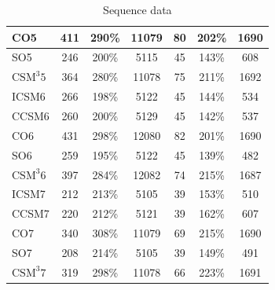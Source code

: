 \documentclass[12pt]{article}
\begin{document}
\begin{table}
\begin{tabular}{| l | c | c | c | c | c | c |}
    CO5 & 411 & 290\% & 11079 & 80 & 202\% & 1690 \\\hline
    SO5 & 246 & 200\% & 5115 & 45 & 143\% & 608 \\\hline
    $\text{CSM}^{3}5$ & 364 & 280\% & 11078 & 75 & 211\% & 1692 \\\hline\hline
%
    ICSM6 & 266 & 198\% & 5122 & 45 & 144\% & 534 \\\hline
    CCSM6 & 260 & 200\% & 5129 & 45 & 142\% & 537 \\\hline
    CO6 & 431 & 298\% & 12080 & 82 & 201\% & 1690 \\\hline
    SO6 & 259 & 195\% & 5122 & 45 & 139\% & 482 \\\hline
    $\text{CSM}^{3}6$ & 397 & 284\% & 12082 & 74 & 215\% & 1687 \\\hline\hline
%
    ICSM7 & 212 & 213\% & 5105 & 39 & 153\% & 510 \\\hline
    CCSM7 & 220 & 212\% & 5121 & 39 & 162\% & 607 \\\hline
    CO7 & 340 & 308\% & 11079 & 69 & 215\% & 1690 \\\hline
    SO7 & 208 & 214\% & 5105 & 39 & 149\% & 491 \\\hline
    $\text{CSM}^{3}7$ & 319 & 298\% & 11078 & 66 & 223\% & 1691 \\\hline
  \end{tabular}
\caption{Sequence data}
\label{tab:algoseq}
\end{table}
%
\end{document}
